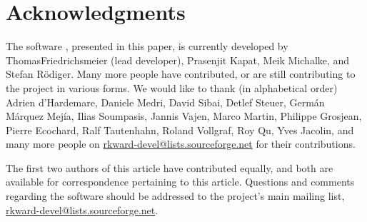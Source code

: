 \section*{Acknowledgments}
\label{sec:acknowledgments}
The software , presented in this paper, is currently developed by Thomas\linebreak Friedrichsmeier (lead developer), Prasenjit Kapat, Meik Michalke,
and Stefan R\"odiger. Many more people have contributed, or are still contributing to the project in various forms. We would like to
thank (in alphabetical order) Adrien d'Hardemare, Daniele Medri, David Sibai, Detlef Steuer, Germ\'an M\'arquez Mej\'ia,
Ilias Soumpasis, Jannis Vajen, Marco Martin, Philippe Grosjean, Pierre Ecochard, Ralf Tautenhahn, Roland Vollgraf, Roy Qu,
Yves Jacolin, and many more people on \url{rkward-devel@lists.sourceforge.net} for their contributions.

The first two authors of this article have contributed equally, and both are available for correspondence pertaining to this article. Questions and comments
regarding the software  should be addressed to the project's main mailing list, \url{rkward-devel@lists.sourceforge.net}.
